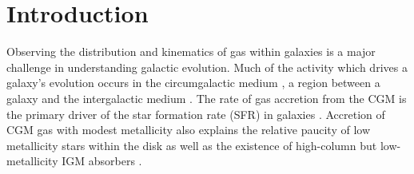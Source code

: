 \documentclass[twocolumn]{aastex62}
\begin{document}



\section{Introduction} \label{sec:intro}
Observing the distribution and kinematics of gas within galaxies is a major challenge in understanding galactic evolution. Much of the activity which drives a galaxy's evolution occurs in the circumgalactic medium \citep[CGM; e.g.,][]{Angles-Alcazar2017, Hafen2019a}, a region between a galaxy and the intergalactic medium \citep{Rudie2012, Shull2014}. The rate of gas accretion from the CGM is the primary driver of the star formation rate (SFR) in galaxies \citep[e.g.,][]{Dekel2009, vandeVoort2011}. Accretion of CGM gas with modest metallicity also explains the relative paucity of low metallicity stars within the disk \citep{vandenBergh1962, Sommer-Larsen1991, WolfWest2012} as well as the existence of high-column but low-metallicity IGM absorbers \citep[e.g.,][]{Lehner2013, Hafen2017}.
\end{document}

